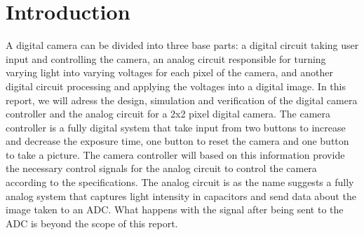 \section{Introduction}

A digital camera can be divided into three base parts: a digital circuit taking user input and controlling the camera, an analog circuit responsible for turning varying light into varying voltages for each pixel of the camera, and another digital circuit processing and applying the voltages into a digital image. In this report, we will adress the design, simulation and verification of the digital camera controller and the analog circuit for a 2x2 pixel digital camera. The camera controller is a fully digital system that take input from two buttons to increase and decrease the exposure time, one button to reset the camera and one button to take a picture. The camera controller will based on this information provide the necessary control signals for the analog circuit to control the camera according to the specifications. The analog circuit is as the name suggests a fully analog system that captures light intensity in capacitors and send data about the image taken to an ADC. What happens with the signal after being sent to the ADC is beyond the scope of this report.
